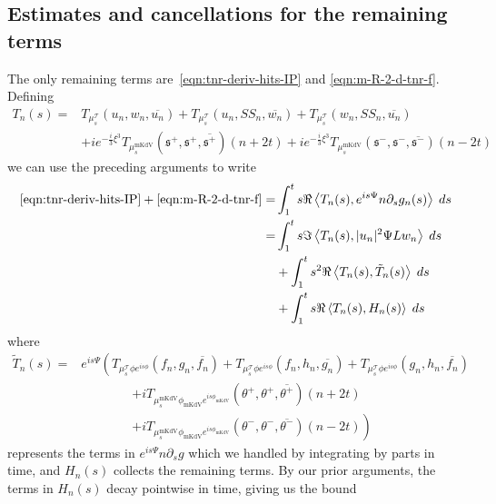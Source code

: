 \documentclass[letterpaper, reqno,final]{amsart}
\newcommand{\cT}{\mathcal{T}}
\newcommand{\fs}{\mathfrak{s}}
\newcommand{\mSS}{\mathit{SS}}
\newcommand{\tmkdv}{\text{mKdV}}
\newcommand{\phimKdV}{\phi_{\tmkdv}}
\begin{document}
\subsection{Estimates and cancellations for the remaining terms}\label{sec:final-ngn}	
The only remaining terms are~\eqref{eqn:tnr-deriv-hits-IP} and \eqref{eqn:m-R-2-d-tnr-f}.  Defining
\begin{equation*}\begin{split}
    T_n(s) =& T_{\mu_s^\cT}(u_n, w_n, \overline{u_n}) + T_{\mu_s^\cT}(u_n, \mSS_n, \overline{w_n}) + T_{\mu_s^\cT}(w_n, \mSS_n, \overline{u_n})\\
    &+ ie^{-\frac{i}{3}\xi^3}T_{\mu_s^\tmkdv}(\fs^+,\fs^+,\overline{\fs^+})(n + 2t) + ie^{-\frac{i}{3}\xi^3}T_{\mu_s^\tmkdv}(\fs^-,\fs^-,\overline{\fs^-})(n - 2t)
\end{split}\end{equation*}
we can use the preceding arguments to write
\begin{subequations}\begin{align}
    \eqref{eqn:tnr-deriv-hits-IP} + \eqref{eqn:m-R-2-d-tnr-f} =& \int_1^t s \Re\left\langle T_n(s), e^{is\Psi} n \partial_s g_n(s)\right\rangle\;ds\notag\\
    =&  \int_1^t s \Im\left\langle T_n(s), |u_n|^2 \Psi Lw_n \right\rangle\;ds\label{eqn:cancel-terms-psiLw}\\
    &+ \int_1^t s^2 \Re\left\langle T_n(s), \tilde{T}_n(s) \right\rangle\;ds\label{eqn:cancel-terms-t-tilde}\\
    &+ \int_1^t s \Re\left\langle T_n(s), H_n(s) \right\rangle\;ds\label{eqn:cancel-terms-easy}
\end{align}\end{subequations}
where
\begin{equation*}\begin{split}
    \tilde{T}_n(s) =& e^{is\Psi}\left(T_{\mu_s^\cT \phi e^{is\phi}}(f_n, g_n, \overline{f_n}) + T_{\mu_s^\cT \phi e^{is\phi}}(f_n, h_n, \overline{g_n}) + T_{\mu_s^\cT \phi e^{is\phi}}(g_n, h_n, \overline{f_n})\right.\\
    &\qquad\qquad\left.+ i T_{\mu_s^\tmkdv \phimKdV e^{is\phimKdV}}(\theta^+,\theta^+,\overline{\theta^+})(n + 2t)\right.\\
    &\qquad\qquad \left.+ i T_{\mu_s^\tmkdv \phimKdV e^{is\phimKdV}}(\theta^-,\theta^-,\overline{\theta^-})(n - 2t)\right)
\end{split}\end{equation*}
represents the terms in $e^{is\Psi} n\partial_s g$ which we handled by integrating by parts in time, and $H_n(s)$ collects the remaining terms.  By our prior arguments, the terms in $H_n(s)$ decay pointwise in time, giving us the bound
\end{document}

